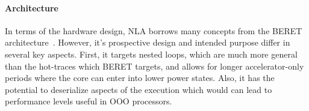 \paragraph{Architecture}
In terms of the hardware design, NLA borrows many concepts from the BERET
architecture~\cite{Gupta:2011:BER:2155620.2155623}.  However, it's prospective
design and intended purpose differ in several key aspects.  First, it targets
nested loops, which are much more general than the hot-traces which BERET
targets, and allows for longer accelerator-only periods where the core can
enter into lower power states.  Also, it has the potential to deserialize
aspects of the execution which would can lead to performance levels useful
in OOO processors.
